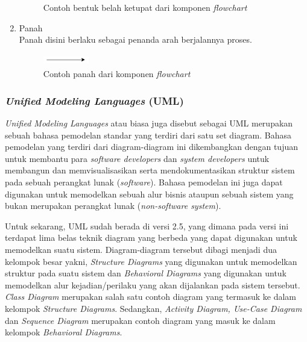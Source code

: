 \documentclass[a4paper]{article}
\newcommand{\subsubbab}[1]{%
    \subsubsection{#1}%
}
\begin{document}
\begin{enumerate}
\begin{figure}[h]
        \caption{Contoh bentuk belah ketupat dari komponen \textit{flowchart}}
    \end{figure}
    \item Panah\\
        Panah disini berlaku sebagai penanda arah berjalannya proses.
    \begin{figure}[h]
        \centering
        \includegraphics*[width=2cm,height=0.5cm]{./diagram/flowchart/component/arrow.png}
        \caption{Contoh panah dari komponen \textit{flowchart}}
    \end{figure}
\end{enumerate}

\newpage

\subsubbab{\textit{Unified Modeling Languages} (\textbf{UML})}
\textit{Unified Modeling Languages} atau biasa juga disebut sebagai UML merupakan sebuah bahasa pemodelan standar yang terdiri dari satu set diagram. Bahasa pemodelan yang terdiri dari diagram-diagram ini dikembangkan dengan tujuan untuk membantu para \textit{software developers} dan \textit{system developers} untuk membangun dan memvisualisasikan serta mendokumentasikan struktur sistem pada sebuah perangkat lunak (\textit{software}). Bahasa pemodelan ini juga dapat digunakan untuk memodelkan sebuah alur bisnis ataupun sebuah sistem yang bukan merupakan perangkat lunak (\textit{non-software system})\autocite{what-is-UML}.

Untuk sekarang, UML sudah berada di versi 2.5, yang dimana pada versi ini terdapat lima belas teknik diagram yang berbeda yang dapat digunakan untuk memodelkan suatu sistem. Diagram-diagram tersebut dibagi menjadi dua kelompok besar yakni, \textit{Structure Diagrams} yang digunakan untuk memodelkan struktur pada suatu sistem dan \textit{Behavioral Diagrams} yang digunakan untuk memodelkan alur kejadian/perilaku yang akan dijalankan pada sistem tersebut. \textit{Class Diagram} merupakan salah satu contoh diagram yang termasuk ke dalam kelompok \textit{Structure Diagrams}. Sedangkan, \textit{Activity Diagram, Use-Case Diagram} dan \textit{Sequence Diagram} merupakan contoh diagram yang masuk ke dalam kelompok \textit{Behavioral Diagrams}\autocite{systemanalysisdesign-with-uml-5}.
\end{document}
